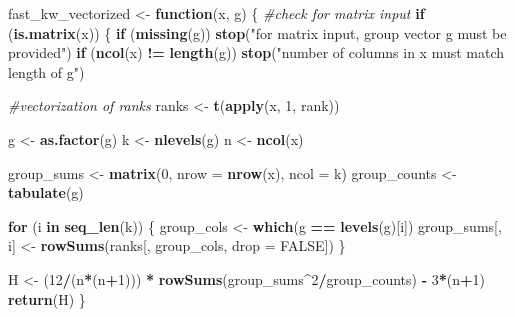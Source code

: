 \documentclass[
]{article}
\newenvironment{Shaded}{\begin{snugshade}}{\end{snugshade}}
\newcommand{\AttributeTok}[1]{\textcolor[rgb]{0.13,0.29,0.53}{#1}}
\newcommand{\CommentTok}[1]{\textcolor[rgb]{0.56,0.35,0.01}{\textit{#1}}}
\newcommand{\ConstantTok}[1]{\textcolor[rgb]{0.56,0.35,0.01}{#1}}
\newcommand{\ControlFlowTok}[1]{\textcolor[rgb]{0.13,0.29,0.53}{\textbf{#1}}}
\newcommand{\DecValTok}[1]{\textcolor[rgb]{0.00,0.00,0.81}{#1}}
\newcommand{\FunctionTok}[1]{\textcolor[rgb]{0.13,0.29,0.53}{\textbf{#1}}}
\newcommand{\NormalTok}[1]{#1}
\newcommand{\OtherTok}[1]{\textcolor[rgb]{0.56,0.35,0.01}{#1}}
\newcommand{\SpecialCharTok}[1]{\textcolor[rgb]{0.81,0.36,0.00}{\textbf{#1}}}
\newcommand{\StringTok}[1]{\textcolor[rgb]{0.31,0.60,0.02}{#1}}
\begin{document}
\begin{Shaded}
\begin{Highlighting}[]
\NormalTok{fast\_kw\_vectorized }\OtherTok{\textless{}{-}} \ControlFlowTok{function}\NormalTok{(x, g) \{}
  \CommentTok{\#check for matrix input}
  \ControlFlowTok{if}\NormalTok{ (}\FunctionTok{is.matrix}\NormalTok{(x)) \{}
    \ControlFlowTok{if}\NormalTok{ (}\FunctionTok{missing}\NormalTok{(g)) }\FunctionTok{stop}\NormalTok{(}\StringTok{"for matrix input, group vector \textquotesingle{}g\textquotesingle{} must be provided"}\NormalTok{)}
    \ControlFlowTok{if}\NormalTok{ (}\FunctionTok{ncol}\NormalTok{(x) }\SpecialCharTok{!=} \FunctionTok{length}\NormalTok{(g)) }\FunctionTok{stop}\NormalTok{(}\StringTok{"number of columns in x must match length of g"}\NormalTok{)}
    
    \CommentTok{\#vectorization of ranks}
\NormalTok{    ranks }\OtherTok{\textless{}{-}} \FunctionTok{t}\NormalTok{(}\FunctionTok{apply}\NormalTok{(x, }\DecValTok{1}\NormalTok{, rank))}
    
\NormalTok{    g }\OtherTok{\textless{}{-}} \FunctionTok{as.factor}\NormalTok{(g)}
\NormalTok{    k }\OtherTok{\textless{}{-}} \FunctionTok{nlevels}\NormalTok{(g)}
\NormalTok{    n }\OtherTok{\textless{}{-}} \FunctionTok{ncol}\NormalTok{(x)}
    
\NormalTok{    group\_sums }\OtherTok{\textless{}{-}} \FunctionTok{matrix}\NormalTok{(}\DecValTok{0}\NormalTok{, }\AttributeTok{nrow =} \FunctionTok{nrow}\NormalTok{(x), }\AttributeTok{ncol =}\NormalTok{ k)}
\NormalTok{    group\_counts }\OtherTok{\textless{}{-}} \FunctionTok{tabulate}\NormalTok{(g)}
    
    \ControlFlowTok{for}\NormalTok{ (i }\ControlFlowTok{in} \FunctionTok{seq\_len}\NormalTok{(k)) \{}
\NormalTok{      group\_cols }\OtherTok{\textless{}{-}} \FunctionTok{which}\NormalTok{(g }\SpecialCharTok{==} \FunctionTok{levels}\NormalTok{(g)[i])}
\NormalTok{      group\_sums[, i] }\OtherTok{\textless{}{-}} \FunctionTok{rowSums}\NormalTok{(ranks[, group\_cols, }\AttributeTok{drop =} \ConstantTok{FALSE}\NormalTok{])}
\NormalTok{    \}}
    
\NormalTok{    H }\OtherTok{\textless{}{-}}\NormalTok{ (}\DecValTok{12}\SpecialCharTok{/}\NormalTok{(n}\SpecialCharTok{*}\NormalTok{(n}\SpecialCharTok{+}\DecValTok{1}\NormalTok{))) }\SpecialCharTok{*} \FunctionTok{rowSums}\NormalTok{(group\_sums}\SpecialCharTok{\^{}}\DecValTok{2}\SpecialCharTok{/}\NormalTok{group\_counts) }\SpecialCharTok{{-}} \DecValTok{3}\SpecialCharTok{*}\NormalTok{(n}\SpecialCharTok{+}\DecValTok{1}\NormalTok{)}
    \FunctionTok{return}\NormalTok{(H)}
\NormalTok{  \}}
  

\end{Highlighting}
\end{Shaded}
\end{document}
